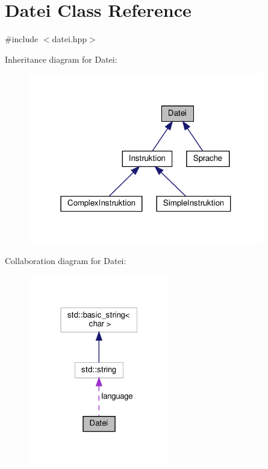 \hypertarget{class_datei}{}\section{Datei Class Reference}
\label{class_datei}


{\ttfamily \#include $<$datei.\+hpp$>$}



Inheritance diagram for Datei\+:
\nopagebreak
\begin{figure}[H]
\begin{center}
\leavevmode
\includegraphics[width=292pt]{class_datei__inherit__graph}
\end{center}
\end{figure}


Collaboration diagram for Datei\+:
\nopagebreak
\begin{figure}[H]
\begin{center}
\leavevmode
\includegraphics[width=175pt]{class_datei__coll__graph}
\end{center}
\end{figure}
